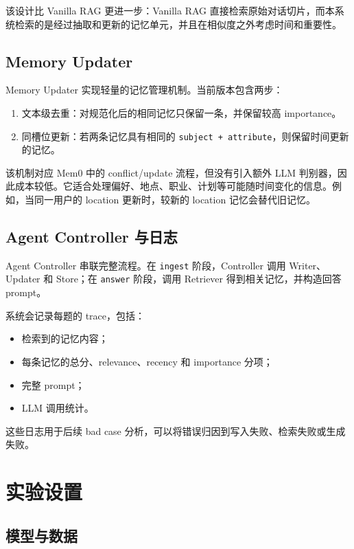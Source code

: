 \documentclass[UTF8,a4paper,11pt]{ctexart}
\begin{document}
该设计比 Vanilla RAG 更进一步：Vanilla RAG 直接检索原始对话切片，而本系统检索的是经过抽取和更新的记忆单元，并且在相似度之外考虑时间和重要性。

\subsection{Memory Updater}

Memory Updater 实现轻量的记忆管理机制。当前版本包含两步：

\begin{enumerate}
  \item 文本级去重：对规范化后的相同记忆只保留一条，并保留较高 importance。
  \item 同槽位更新：若两条记忆具有相同的 \texttt{subject + attribute}，则保留时间更新的记忆。
\end{enumerate}

该机制对应 Mem0 中的 conflict/update 流程，但没有引入额外 LLM 判别器，因此成本较低。它适合处理偏好、地点、职业、计划等可能随时间变化的信息。例如，当同一用户的 location 更新时，较新的 location 记忆会替代旧记忆。

\subsection{Agent Controller 与日志}

Agent Controller 串联完整流程。在 \texttt{ingest} 阶段，Controller 调用 Writer、Updater 和 Store；在 \texttt{answer} 阶段，调用 Retriever 得到相关记忆，并构造回答 prompt。

系统会记录每题的 trace，包括：

\begin{itemize}
  \item 检索到的记忆内容；
  \item 每条记忆的总分、relevance、recency 和 importance 分项；
  \item 完整 prompt；
  \item LLM 调用统计。
\end{itemize}

这些日志用于后续 bad case 分析，可以将错误归因到写入失败、检索失败或生成失败。

\section{实验设置}

\subsection{模型与数据}
\end{document}
